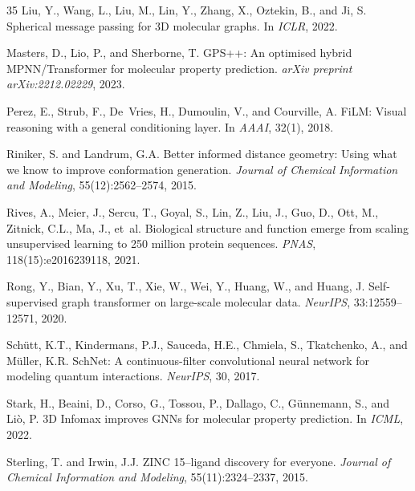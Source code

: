 \documentclass[11pt]{article}
\begin{document}
\begin{thebibliography}{35}
Liu, Y., Wang, L., Liu, M., Lin, Y., Zhang, X., Oztekin, B., and Ji, S.
\newblock Spherical message passing for 3D molecular graphs.
\newblock In \emph{ICLR}, 2022.

Masters, D., Lio, P., and Sherborne, T.
\newblock GPS++: An optimised hybrid MPNN/Transformer for molecular property prediction.
\newblock \emph{arXiv preprint arXiv:2212.02229}, 2023.

Perez, E., Strub, F., De~Vries, H., Dumoulin, V., and Courville, A.
\newblock FiLM: Visual reasoning with a general conditioning layer.
\newblock In \emph{AAAI}, 32(1), 2018.

Riniker, S. and Landrum, G.A.
\newblock Better informed distance geometry: Using what we know to improve conformation generation.
\newblock \emph{Journal of Chemical Information and Modeling}, 55(12):2562--2574, 2015.

Rives, A., Meier, J., Sercu, T., Goyal, S., Lin, Z., Liu, J., Guo, D., Ott, M., Zitnick, C.L., Ma, J., et~al.
\newblock Biological structure and function emerge from scaling unsupervised learning to 250 million protein sequences.
\newblock \emph{PNAS}, 118(15):e2016239118, 2021.

Rong, Y., Bian, Y., Xu, T., Xie, W., Wei, Y., Huang, W., and Huang, J.
\newblock Self-supervised graph transformer on large-scale molecular data.
\newblock \emph{NeurIPS}, 33:12559--12571, 2020.

Sch{\"u}tt, K.T., Kindermans, P.J., Sauceda, H.E., Chmiela, S., Tkatchenko, A., and M{\"u}ller, K.R.
\newblock SchNet: A continuous-filter convolutional neural network for modeling quantum interactions.
\newblock \emph{NeurIPS}, 30, 2017.

Stark, H., Beaini, D., Corso, G., Tossou, P., Dallago, C., G{\"u}nnemann, S., and Li{\`o}, P.
\newblock 3D Infomax improves GNNs for molecular property prediction.
\newblock In \emph{ICML}, 2022.

Sterling, T. and Irwin, J.J.
\newblock ZINC 15--ligand discovery for everyone.
\newblock \emph{Journal of Chemical Information and Modeling}, 55(11):2324--2337, 2015.


\end{thebibliography}
\end{document}
